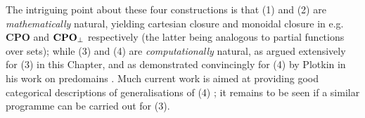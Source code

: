 The intriguing point about these four constructions is that (1) and (2) are {\em mathematically} natural, 
yielding cartesian closure and monoidal closure in e.g. {\bf CPO} and ${\bf CPO}_{\bot}$ respectively (the latter being analogous to partial functions over sets); 
while (3) and (4) are {\em computationally} natural, as argued extensively for (3) in this Chapter, 
and as demonstrated convincingly for (4) by Plotkin in his work on predomains \cite{Plo85}. 
Much current work is aimed at providing good categorical descriptions of generalisations of (4) \cite{Ros86,RR87,Mog86,Mog87a,Mog87b}; it remains to be seen if a similar programme can be carried out for (3).
